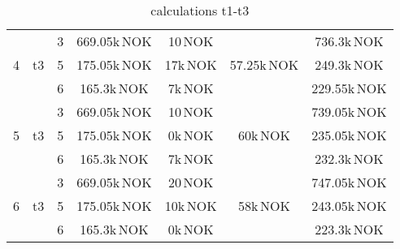 \documentclass{article}
\begin{document}
\begin{table}[hbt!]
\begin{center}
\begin{tabular}[h]{|c|c|c||c|c|c||c|}
\hline
\multirow{3}{*}{4} & \multirow{3}{*}{t3}	
	&	3		&		669.05k\,NOK	&	10\,NOK			&	\multirow{3}{*}{57.25k\,NOK}		&	736.3k\,NOK\\
&	&	5		&		175.05k\,NOK	&	17k\,NOK		&										&	249.3k\,NOK\\
&	&	6		&		165.3k\,NOK		&	7k\,NOK			&										&	229.55k\,NOK\\
\hline
\multirow{3}{*}{5} & \multirow{3}{*}{t3}	
	&	3		&		669.05k\,NOK	&	10\,NOK			&	\multirow{3}{*}{60k\,NOK}			&	739.05k\,NOK\\
&	&	5		&		175.05k\,NOK	&	0k\,NOK			&										&	235.05k\,NOK\\
&	&	6		&		165.3k\,NOK		&	7k\,NOK			&										&	232.3k\,NOK\\
\hline
\multirow{3}{*}{6} & \multirow{3}{*}{t3}	
	&	3		&		669.05k\,NOK	&	20\,NOK			&	\multirow{3}{*}{58k\,NOK}			&	747.05k\,NOK\\
&	&	5		&		175.05k\,NOK	&	10k\,NOK		&										&	243.05k\,NOK\\
&	&	6		&		165.3k\,NOK		&	0k\,NOK			&										&	223.3k\,NOK\\
\hline
\end{tabular}
\caption{calculations t1-t3}\label{tab:calct13}
\end{center}
\end{table}
\end{document}
